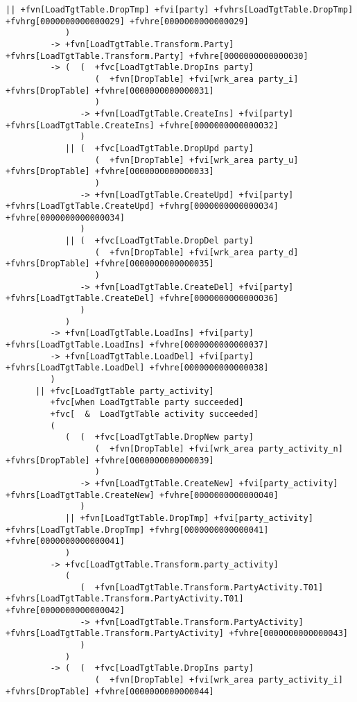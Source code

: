 \documentclass[a4paper,12pt,english,oneside]{book}
\begin{document}
\begin{landscape}
\begin{Verbatim}[commandchars=+\[\]]
            || +fvn[LoadTgtTable.DropTmp] +fvi[party] +fvhrs[LoadTgtTable.DropTmp] +fvhrg[0000000000000029] +fvhre[0000000000000029]
            )  
         -> +fvn[LoadTgtTable.Transform.Party] +fvhrs[LoadTgtTable.Transform.Party] +fvhre[0000000000000030]
         -> (  (  +fvc[LoadTgtTable.DropIns party]
                  (  +fvn[DropTable] +fvi[wrk_area party_i] +fvhrs[DropTable] +fvhre[0000000000000031]
                  )
               -> +fvn[LoadTgtTable.CreateIns] +fvi[party] +fvhrs[LoadTgtTable.CreateIns] +fvhre[0000000000000032]
               )  
            || (  +fvc[LoadTgtTable.DropUpd party]
                  (  +fvn[DropTable] +fvi[wrk_area party_u] +fvhrs[DropTable] +fvhre[0000000000000033]
                  )
               -> +fvn[LoadTgtTable.CreateUpd] +fvi[party] +fvhrs[LoadTgtTable.CreateUpd] +fvhrg[0000000000000034] +fvhre[0000000000000034]
               )  
            || (  +fvc[LoadTgtTable.DropDel party]
                  (  +fvn[DropTable] +fvi[wrk_area party_d] +fvhrs[DropTable] +fvhre[0000000000000035]
                  )
               -> +fvn[LoadTgtTable.CreateDel] +fvi[party] +fvhrs[LoadTgtTable.CreateDel] +fvhre[0000000000000036]
               )  
            )  
         -> +fvn[LoadTgtTable.LoadIns] +fvi[party] +fvhrs[LoadTgtTable.LoadIns] +fvhre[0000000000000037]
         -> +fvn[LoadTgtTable.LoadDel] +fvi[party] +fvhrs[LoadTgtTable.LoadDel] +fvhre[0000000000000038]
         )  
      || +fvc[LoadTgtTable party_activity]
         +fvc[when LoadTgtTable party succeeded]
         +fvc[  &  LoadTgtTable activity succeeded]
         (  
            (  (  +fvc[LoadTgtTable.DropNew party]
                  (  +fvn[DropTable] +fvi[wrk_area party_activity_n] +fvhrs[DropTable] +fvhre[0000000000000039]
                  )
               -> +fvn[LoadTgtTable.CreateNew] +fvi[party_activity] +fvhrs[LoadTgtTable.CreateNew] +fvhre[0000000000000040]
               )  
            || +fvn[LoadTgtTable.DropTmp] +fvi[party_activity] +fvhrs[LoadTgtTable.DropTmp] +fvhrg[0000000000000041] +fvhre[0000000000000041]
            )  
         -> +fvc[LoadTgtTable.Transform.party_activity]
            (  
               (  +fvn[LoadTgtTable.Transform.PartyActivity.T01] +fvhrs[LoadTgtTable.Transform.PartyActivity.T01] +fvhre[0000000000000042]
               -> +fvn[LoadTgtTable.Transform.PartyActivity] +fvhrs[LoadTgtTable.Transform.PartyActivity] +fvhre[0000000000000043]
               )  
            )  
         -> (  (  +fvc[LoadTgtTable.DropIns party]
                  (  +fvn[DropTable] +fvi[wrk_area party_activity_i] +fvhrs[DropTable] +fvhre[0000000000000044]

\end{Verbatim}
\end{landscape}
\end{document}
